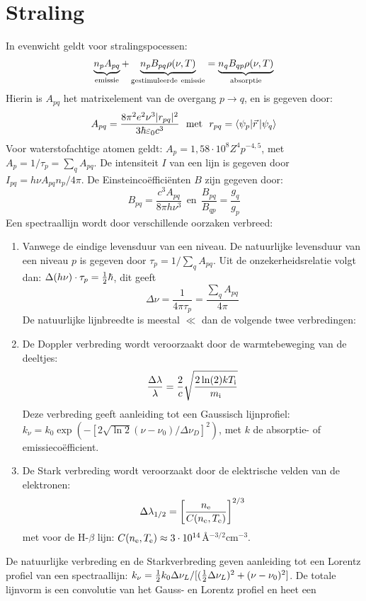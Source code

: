 \section{Straling}
In evenwicht geldt voor stralingspocessen:
\[
\underbrace{n_pA_{pq}}_{\rm emissie}+
\underbrace{n_pB_{pq}\rho(\nu,T)}_{\rm gestimuleerde~emissie}=
\underbrace{n_qB_{qp}\rho(\nu,T)}_{\rm absorptie}
\]
Hierin is $A_{pq}$ het matrixelement van de overgang $p\rightarrow q$, en is
gegeven door:
\[
A_{pq}=\frac{8\pi^2e^2\nu^3|r_{pq}|^2}{3\hbar\varepsilon_0c^3}~~\mbox{met}~~
r_{pq}=\langle\psi_p|\vec{r}\,|\psi_q\rangle
\]
Voor waterstofachtige atomen geldt: $A_p=1,58\cdot10^8Z^4p^{-4,5}$, met
$A_p=1/\tau_p=\sum\limits_qA_{pq}$. De intensiteit $I$ van een lijn is
gegeven door $I_{pq}=h\nu A_{pq}n_p/4\pi$. De Einsteinco\"effici\"enten $B$
zijn gegeven door:
\[
B_{pq}=\frac{c^3A_{pq}}{8\pi h\nu^3}~~\mbox{en}~~\frac{B_{pq}}{B_{qp}}=\frac{g_q}{g_p}
\]
Een spectraallijn wordt door verschillende oorzaken verbreed:
\begin{enumerate}
\item Vanwege de eindige levensduur van een niveau. De natuurlijke levensduur
      van een niveau $p$ is gegeven door $\tau_p=1/\sum\limits_q A_{pq}$. Uit
      de onzekerheidsrelatie volgt dan: $\Delta(h\nu)\cdot\tau_p=\mbox{$\frac{1}{2}$}\hbar$,
      dit geeft
      \[
      \Delta\nu=\frac{1}{4\pi\tau_p}=\frac{\sum\limits_qA_{pq}}{4\pi}
      \]
      De natuurlijke lijnbreedte is meestal $\ll$ dan de volgende twee
      verbredingen:
\item De Doppler verbreding wordt veroorzaakt door de warmtebeweging van de
      deeltjes:
      \[
      \frac{\Delta\lambda}{\lambda}=\frac{2}{c}\sqrt{\frac{2\ln(2)kT_{\rm i}}{m_{\rm i}}}
      \]
      Deze verbreding geeft aanleiding tot een Gaussisch lijnprofiel:\\
      $k_\nu=k_0\exp(-[2\sqrt{\ln 2}(\nu-\nu_0)/\Delta\nu_D]^2)$, met $k$ de
      absorptie- of emissieco\"efficient.
\item De Stark verbreding wordt veroorzaakt door de elektrische velden van de
      elektronen:
      \[
      \Delta\lambda_{1/2}=\left[\frac{n_{\rm e}}{C(n_{\rm e},T_{\rm e})}\right]^{2/3}
      \]
      met voor de H-$\beta$ lijn: $C(n_{\rm e},T_{\rm e})\approx3\cdot10^{14}$\AA$^{-3/2}$cm$^{-3}$.
\end{enumerate}
De natuurlijke verbreding en de Starkverbreding geven aanleiding tot een
Lorentz profiel van een spectraallijn:
$k_\nu=\mbox{$\frac{1}{2}$} k_0\Delta\nu_L/[(\mbox{$\frac{1}{2}$}\Delta\nu_L)^2+(\nu-\nu_0)^2]$. De totale
lijnvorm is een convolutie van het Gauss- en Lorentz profiel en heet een
